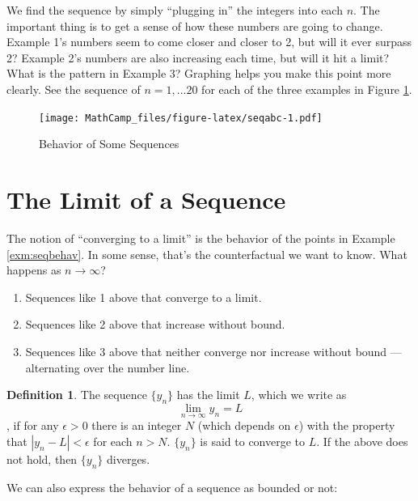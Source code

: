 \documentclass[
]{book}
\providecommand{\tightlist}{%
  \setlength{\itemsep}{0pt}\setlength{\parskip}{0pt}}
\theoremstyle{definition}
\newtheorem{definition}{Definition}[chapter]
\theoremstyle{definition}
\theoremstyle{definition}
\theoremstyle{definition}
\theoremstyle{remark}
\begin{document}
We find the sequence by simply ``plugging in'' the integers into each \(n\). The important thing is to get a sense of how these numbers are going to change. Example 1's numbers seem to come closer and closer to 2, but will it ever surpass 2? Example 2's numbers are also increasing each time, but will it hit a limit? What is the pattern in Example 3? Graphing helps you make this point more clearly. See the sequence of \(n = 1, ...20\) for each of the three examples in Figure \ref{fig:seqabc}.

\begin{figure}
\centering
\texttt{[image: MathCamp\_files/figure-latex/seqabc-1.pdf]}
\caption{\label{fig:seqabc}Behavior of Some Sequences}
\end{figure}

\hypertarget{the-limit-of-a-sequence}{%
\section{The Limit of a Sequence}\label{the-limit-of-a-sequence}}

The notion of ``converging to a limit'' is the behavior of the points in Example \ref{exm:seqbehav}. In some sense, that's the counterfactual we want to know. What happens as \(n\rightarrow \infty\)?

\begin{enumerate}
\def\labelenumi{\arabic{enumi}.}
\tightlist
\item
  Sequences like 1 above that converge to a limit.
\item
  Sequences like 2 above that increase without bound.
\item
  Sequences like 3 above that neither converge nor increase without bound --- alternating over the number line.
\end{enumerate}

\begin{definition}
\protect\hypertarget{def:unnamed-chunk-189}{}{\label{def:unnamed-chunk-189} }The sequence \(\{y_n\}\) has the limit \(L\), which we write as \[\lim\limits_{n \to \infty} y_n =L\], if for any \(\epsilon>0\) there is an integer \(N\) (which depends on \(\epsilon\)) with the property that \(|y_n -L|<\epsilon\) for each \(n>N\). \(\{y_n\}\) is said to converge to \(L\). If the above does not hold, then \(\{y_n\}\) diverges.
\end{definition}

We can also express the behavior of a sequence as bounded or not:
\end{document}
